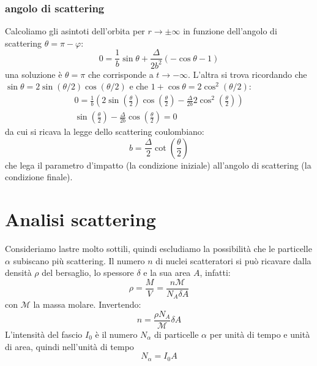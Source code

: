 \subsubsection{angolo di scattering}
Calcoliamo gli asintoti dell'orbita per $r\to\pm\infty$ in funzione dell'angolo di scattering $\theta=\pi-\varphi$:
\[
	0=\frac{1}{b}\sin\theta+\frac{\Delta}{2b^2}\left(-\cos\theta-1\right)
\]
una soluzione è $\theta = \pi$ che corrisponde a $t\to -\infty$. L'altra si trova ricordando che $\sin\theta=2\sin(\theta/2)\cos(\theta/2)$ e che $1+\cos\theta=2\cos^2(\theta/2)$:
\begin{gather*}
	0=\frac{1}{b}\left(2\sin\left(\frac{\theta}{2}\right)\cos\left(\frac{\theta}{2}\right)-\frac{\Delta}{2b}2\cos^2\left(\frac{\theta}{2}\right)\right)\\
	\sin\left(\frac{\theta}{2}\right)-\frac{\Delta}{2b}\cos\left(\frac{\theta}{2}\right)=0
\end{gather*}
da cui si ricava la legge dello scattering coulombiano:
\begin{equation}
	b=\frac{\Delta}{2}\cot\left(\frac{\theta}{2}\right)
\end{equation}
che lega il parametro d'impatto (la condizione iniziale) all'angolo di scattering (la condizione finale).
\section{Analisi scattering}
Consideriamo lastre molto sottili, quindi escludiamo la possibilità che le particelle $\alpha$ subiscano più scattering. Il numero $n$ di nuclei scatteratori si può ricavare dalla densità $\rho$ del bersaglio, lo spessore $\delta$ e la sua area $A$, infatti:
\[
	\rho=\frac{M}{V}=\frac{n\mathcal{M}}{N_A\delta A}
\]
con $\mathcal{M}$ la massa molare. Invertendo:
\begin{equation}
	n=\frac{\rho N_A}{\mathcal{M}}\delta A
\end{equation}
L'intensità del fascio $I_0$ è il numero $N_\alpha$ di particelle $\alpha$ per unità di tempo e unità di area, quindi nell'unità di tempo
\begin{equation}
	N_\alpha=I_0A
\end{equation}

